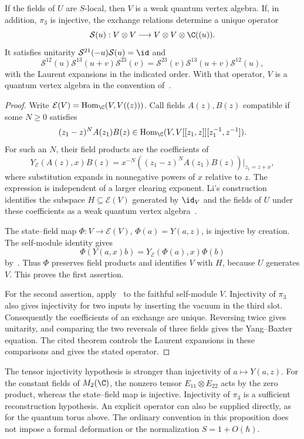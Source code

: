 \begin{proposition}\label{cbc:disc:generators}
If the fields of $U$ are $S$-local, then $V$ is a weak quantum vertex algebra.
If, in addition, $\pi_3$ is injective, the exchange relations determine a unique operator
\[
 \mathcal S(u):V\otimes V\longrightarrow
                    V\otimes V\otimes\C((u)).
\]
It satisfies unitarity $\mathcal S^{21}(-u)\mathcal S(u)=\id$ and
\[
 \mathcal S^{12}(u)\mathcal S^{13}(u+v)\mathcal S^{23}(v)
   =\mathcal S^{23}(v)\mathcal S^{13}(u+v)\mathcal S^{12}(u),
\]
with the Laurent expansions in the indicated order.
With that operator, $V$ is a quantum vertex algebra in the convention of~\cite[Definition 5.10 and Theorem 5.11]{LiNonlocal}.
\end{proposition}
\begin{proof}
Write $\mathcal E(V)=\operatorname{Hom}_{\C}(V,V((z)))$.
Call fields $A(z),B(z)$ compatible if some $N\geq0$ satisfies
\[
 (z_1-z)^N A(z_1)B(z)
       \in\operatorname{Hom}_{\C}(V,V[[z_1,z]][z_1^{-1},z^{-1}]).
\]
For such an $N$, their field products are the coefficients of
\[
 Y_{\mathcal E}(A(z),x)B(z)
   =x^{-N}\left((z_1-z)^NA(z_1)B(z)\right)\big|_{z_1=z+x},
\]
where substitution expands in nonnegative powers of $x$ relative to $z$.
The expression is independent of a larger clearing exponent.
Li's construction identifies the subspace $H\subseteq\mathcal E(V)$ generated by $\id_V$ and the fields of $U$ under these coefficients as a weak quantum vertex algebra~\cite[Definition 2.11 and Theorem 5.8]{LiNonlocal}.

The state--field map $\Phi:V\to\mathcal E(V)$, $\Phi(a)=Y(a,z)$, is injective by creation.
The self-module identity gives
\[
 \Phi(Y(a,x)b)=Y_{\mathcal E}(\Phi(a),x)\Phi(b)
\]
by~\cite[Proposition 2.22]{LiNonlocal}.
Thus $\Phi$ preserves field products and identifies $V$ with $H$, because $U$ generates $V$.
This proves the first assertion.

For the second assertion, apply~\cite[Theorems 4.8 and 5.11]{LiNonlocal} to the faithful self-module $V$.
Injectivity of $\pi_3$ also gives injectivity for two inputs by inserting the vacuum in the third slot.
Consequently the coefficients of an exchange are unique.
Reversing twice gives unitarity, and comparing the two reversals of three fields gives the Yang--Baxter equation.
The cited theorem controls the Laurent expansions in these comparisons and gives the stated operator.
\end{proof}

The tensor injectivity hypothesis is stronger than injectivity of $a\mapsto Y(a,z)$.
For the constant fields of $M_2(\C)$, the nonzero tensor $E_{11}\otimes E_{22}$ acts by the zero product, whereas the state--field map is injective.
Injectivity of $\pi_3$ is a sufficient reconstruction hypothesis.
An explicit operator can also be supplied directly, as for the quantum torus above.
The ordinary convention in this proposition does not impose a formal deformation or the normalization $S=1+O(\hbar)$.

